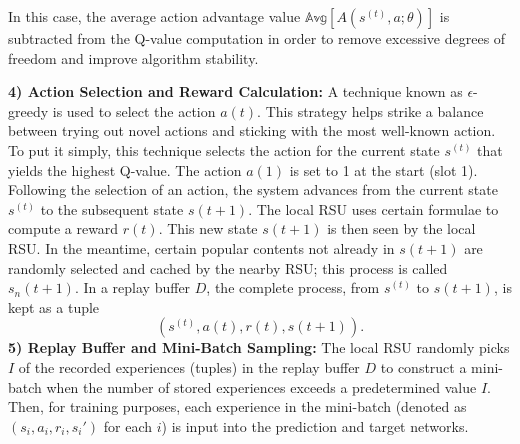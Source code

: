 \documentclass[journal]{IEEEtran}
\begin{document}
In this case, the average action advantage value $\mathbb{Avg}[A(s^{(t)},a;\theta)]$ is subtracted from the Q-value computation in order to remove excessive degrees of freedom and improve algorithm stability. 

\textbf{4) Action Selection and Reward Calculation:} A technique known as $\epsilon$-greedy is used to select the action $a(t)$. This strategy helps strike a balance between trying out novel actions and sticking with the most well-known action. To put it simply, this technique selects the action for the current state $s^{(t)}$ that yields the highest Q-value. The action $a(1)$ is set to 1 at the start (slot 1). Following the selection of an action, the system advances from the current state $s^{(t)}$ to the subsequent state $s(t+1)$. The local RSU uses certain formulae to compute a reward $r(t)$. This new state $s(t+1)$ is then seen by the local RSU. In the meantime, certain popular contents not already in $s(t+1)$ are randomly selected and cached by the nearby RSU; this process is called $s_n(t+1)$. In a replay buffer $D$, the complete process, from $s^{(t)}$ to $s(t+1)$, is kept as a tuple
\begin{equation} \label{eq:15}
(s^{(t)}, a(t), r(t), s(t+1)). 
\end{equation}
\textbf{5) Replay Buffer and Mini-Batch Sampling:} The local RSU randomly picks $I$ of the recorded experiences (tuples) in the replay buffer $D$ to construct a mini-batch when the number of stored experiences exceeds a predetermined value $I$. Then, for training purposes, each experience in the mini-batch (denoted as $(s_i, a_i, r_i, s_i')$ for each $i$) is input into the prediction and target networks. 
\end{document}
